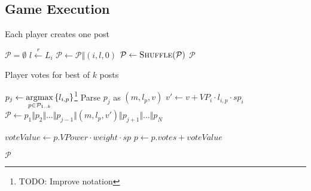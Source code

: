   \subsection{Game Execution}
    \begin{algorithm}
      \caption{Each player creates one post}
      \label{alg:postGen}
      \begin{algorithmic}[1]
        \State $\mathcal{P} = \emptyset$ 
           \State $l \xleftarrow{r} L_i$
           \State $\mathcal{P} \leftarrow \mathcal{P} \Vert \left(i, l, 0\right)$
        \EndFor
        \State $\mathcal{P} \leftarrow \textsc{Shuffle}(\mathcal{P})$
        \State \Return $\mathcal{P}$
      \EndFunction
      \end{algorithmic}
    \end{algorithm}

    \begin{algorithm}%
      \caption{Player votes for best of $k$ posts}
      \label{alg:vote}
      \begin{algorithmic}[1]
            \State $p_j \leftarrow \operatorname*{argmax}\limits_{p \in \mathcal{P}_{1 ..
              k}}{\lbrace l_{i, p}\rbrace}$\footnote{TODO: Improve notation}
            \State Parse $p_j$ as $\left(m, l_p, v\right)$
            \State $v' \leftarrow v + VP_i \cdot l_{i, p} \cdot sp_i$
            \State $\mathcal{P} \leftarrow p_1 \Vert p_2 \Vert \dots \Vert
            p_{j-1} \Vert \left(m, l_p, v'\right) \Vert p_{j+1} \Vert \dots \Vert
            p_N$
          \EndCase

             \State
               \State $voteValue \leftarrow p.VPower \cdot weight \cdot sp$
               \State $p \leftarrow p.votes +  voteValue$
             \EndIf
          \EndCase
        \EndSwitch

        \State \Return $\mathcal{P}$
      \EndFunction
      \end{algorithmic}
    \end{algorithm}

